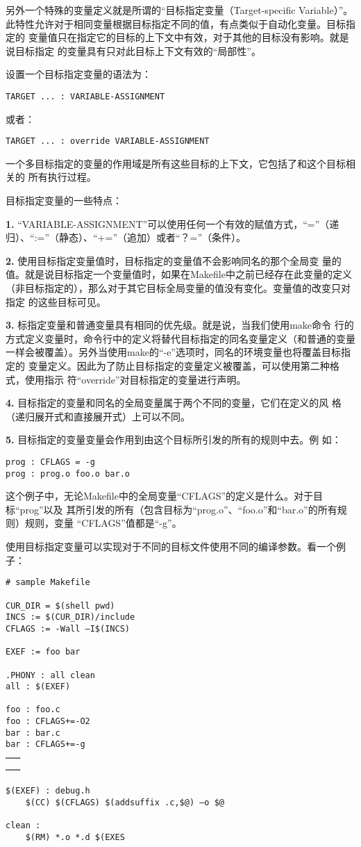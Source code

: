 另外一个特殊的变量定义就是所谓的“目标指定变量（Target-specific Variable）”。
此特性允许对于相同变量根据目标指定不同的值，有点类似于自动化变量。目标指定的
变量值只在指定它的目标的上下文中有效，对于其他的目标没有影响。就是说目标指定
的变量具有只对此目标上下文有效的“局部性”。

设置一个目标指定变量的语法为：
\begin{Verbatim}[]
TARGET ... : VARIABLE-ASSIGNMENT
\end{Verbatim}
\noindent 或者：
\begin{Verbatim}[]
TARGET ... : override VARIABLE-ASSIGNMENT
\end{Verbatim}

一个多目标指定的变量的作用域是所有这些目标的上下文，它包括了和这个目标相关的
所有执行过程。

目标指定变量的一些特点：

\textbf{1.} “VARIABLE-ASSIGNMENT”可以使用任何一个有效的赋值方式，“=”（递
归）、“:=”（静态）、“+=”（追加）或者“？=”（条件）。

\textbf{2.}   使用目标指定变量值时，目标指定的变量值不会影响同名的那个全局变
量的值。就是说目标指定一个变量值时，如果在Makefile中之前已经存在此变量的定义
（非目标指定的），那么对于其它目标全局变量的值没有变化。变量值的改变只对指定
的这些目标可见。

\textbf{3.} 标指定变量和普通变量具有相同的优先级。就是说，当我们使用make命令
行的方式定义变量时，命令行中的定义将替代目标指定的同名变量定义（和普通的变量
一样会被覆盖）。另外当使用make的“-e”选项时，同名的环境变量也将覆盖目标指定的
变量定义。因此为了防止目标指定的变量定义被覆盖，可以使用第二种格式，使用指示
符“override”对目标指定的变量进行声明。

\textbf{4.} 目标指定的变量和同名的全局变量属于两个不同的变量，它们在定义的风
格（递归展开式和直接展开式）上可以不同。

\textbf{5.} 目标指定的变量变量会作用到由这个目标所引发的所有的规则中去。例
如：

\begin{Verbatim}[]
prog : CFLAGS = -g
prog : prog.o foo.o bar.o
\end{Verbatim}

这个例子中，无论Makefile中的全局变量“CFLAGS”的定义是什么。对于目标“prog”以及
其所引发的所有（包含目标为“prog.o”、“foo.o”和“bar.o”的所有规则）规则，变量
“CFLAGS”值都是“-g”。

使用目标指定变量可以实现对于不同的目标文件使用不同的编译参数。看一个例子：

\begin{Verbatim}[]
# sample Makefile

CUR_DIR = $(shell pwd)
INCS := $(CUR_DIR)/include
CFLAGS := -Wall –I$(INCS)

EXEF := foo bar

.PHONY : all clean
all : $(EXEF)

foo : foo.c
foo : CFLAGS+=-O2
bar : bar.c
bar : CFLAGS+=-g
………
………

$(EXEF) : debug.h
    $(CC) $(CFLAGS) $(addsuffix .c,$@) –o $@

clean :
    $(RM) *.o *.d $(EXES
\end{Verbatim}

